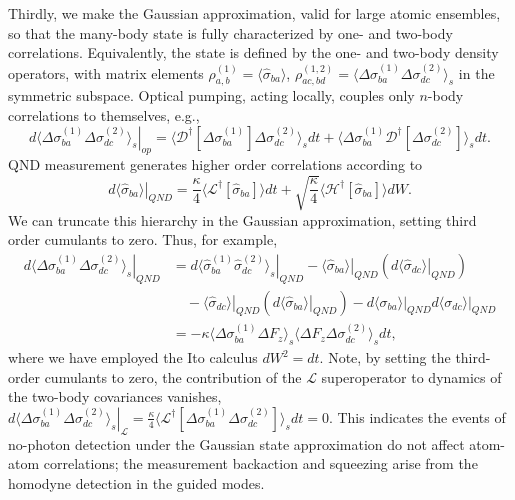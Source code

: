 \documentclass[preprint,aps,pra,onecolumn,superscriptaddress]{revtex4-1} %
\newcommand{\expect}[1]{\big\langle #1 \big\rangle}
\begin{document}
Thirdly, we make the Gaussian approximation, valid for large atomic ensembles, so that the many-body state is fully characterized by one- and two-body correlations. Equivalently, the state is defined by the one- and two-body density operators, with matrix elements $\rho^{(1)}_{a, b} =\expect{\hat{\sigma}_{ba}}$, $\rho^{(1,2)}_{ac,bd}=\expect{\Delta \sigma_{ba}^{(1)}\Delta\sigma_{dc}^{(2)} }_s$ in the symmetric subspace.   Optical pumping, acting locally, couples only $n$-body correlations to themselves, e.g.,
\begin{equation}\label{eq:dsigmabadc_op}
\left.d\expect{\Delta \sigma_{ba}^{(1)}\Delta\sigma_{dc}^{(2)} }_s\right|_{op} = \expect{\mathcal{D}^\dagger[\Delta \sigma_{ba}^{(1)}]\Delta\sigma_{dc}^{(2)} }_sdt + \expect{\Delta \sigma_{ba}^{(1)} \mathcal{D}^\dagger[\Delta\sigma_{dc}^{(2)}] }_sdt .
\end{equation}
QND measurement generates higher order correlations according to
\begin{equation}\label{eq:dsigmaba_QND}
\left.d\expect{\hat{\sigma}_{ba}}\right|_{QND} =\frac{\kappa}{4}\expect{\mathcal{L}^\dagger\left[\hat{\sigma}_{ba} \right]}dt + \sqrt{\frac{\kappa}{4}}\expect{\mathcal{H}^\dagger\left[\hat{\sigma}_{ba} \right]}dW .
\end{equation}
We can truncate this hierarchy in the Gaussian approximation, setting third order cumulants to zero.  Thus, for example,
\begin{align}
\left.d\expect{\Delta \sigma_{ba}^{(1)} \Delta \sigma_{dc}^{(2)}}_s \right|_{QND} &= \left.d\expect{\hat{\sigma}_{ba}^{(1)} \hat{\sigma}_{dc}^{(2)}}_s \right|_{QND} - \left. \expect{\hat{\sigma}_{ba}} \right|_{QND} \left( \left.d\expect{\hat{\sigma}_{dc}} \right|_{QND}\right) \nonumber\\
&\quad - \left. \expect{\hat{\sigma}_{dc}} \right|_{QND} \left( \left.d\expect{\hat{\sigma}_{ba}} \right|_{QND}\right)
- \left.d\expect{\sigma_{ba}} \right|_{QND}\left.d\expect{\sigma_{dc}} \right|_{QND} \nonumber \\
&= -\kappa\expect{\Delta \sigma^{(1)}_{ba}  \Delta F_z }_s \expect{\Delta F_z \Delta \sigma_{dc}^{(2)} }_sdt,\label{eq:dsigmabadc_QND}
\end{align}
where we have employed the Ito calculus $dW^2 = dt$.
Note, by setting the third-order cumulants to zero,  the contribution of the $\mathcal{L}$ superoperator to dynamics of the two-body covariances vanishes,  $ \left.d\expect{\Delta \sigma_{ba}^{(1)} \Delta \sigma_{dc}^{(2)}}_s\right|_\mathcal{L} =\frac{\kappa}{4}\expect{\mathcal{L}^\dagger\left[\Delta\sigma_{ba}^{(1)}\Delta\sigma_{dc}^{(2)} \right]}_sdt=0 $.  This indicates the events of no-photon detection under the Gaussian state approximation do not affect atom-atom correlations;  the measurement backaction and squeezing arise from the homodyne detection in the guided modes. 
\end{document}
